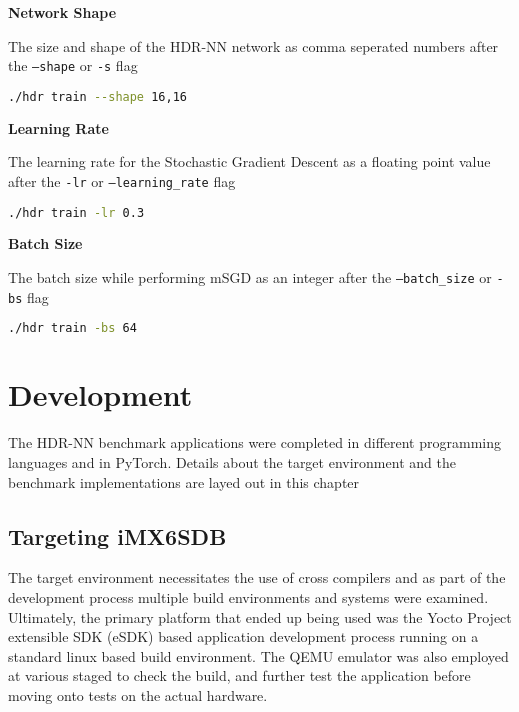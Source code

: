 \textbf{Network Shape}

The size and shape of the HDR-NN network as comma seperated numbers after the \texttt{--shape} or \texttt{-s} flag

\begin{lstlisting}[language=Bash]
	./hdr train --shape 16,16
\end{lstlisting}

\textbf{Learning Rate}

The learning rate for the Stochastic Gradient Descent as a floating point value after the \texttt{-lr} or \texttt{--learning\_rate} flag

\begin{lstlisting}[language=Bash]
	./hdr train -lr 0.3
\end{lstlisting}

\textbf{Batch Size}

The batch size while performing mSGD as an integer after the \texttt{--batch\_size} or \texttt{-bs} flag

\begin{lstlisting}[language=Bash]
	./hdr train -bs 64
\end{lstlisting}



\chapter{Development}

The HDR-NN benchmark applications were completed in different programming languages and in PyTorch. Details about the target environment and the benchmark implementations are layed out in this chapter

\section[iMX6 Custom Board Target]{Targeting iMX6SDB}

The target environment necessitates the use of cross compilers and as part of the development process multiple build environments and systems were examined. Ultimately, the primary platform that ended up being used was the Yocto Project extensible SDK (eSDK) based application development process running on a standard linux based build environment. The QEMU emulator was also employed at various staged to check the build, and further test the application before moving onto tests on the actual hardware.


